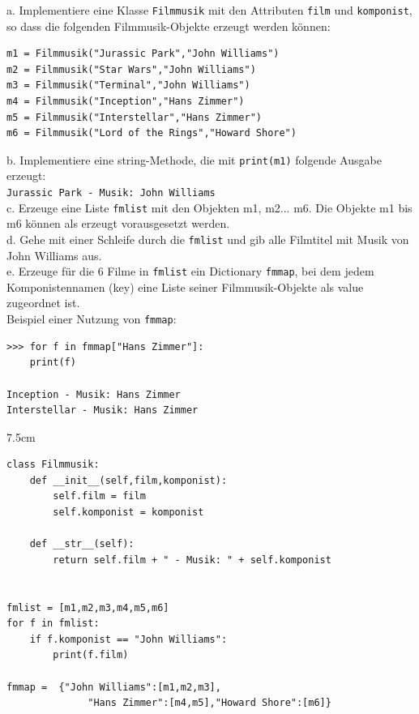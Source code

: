 \question[9]
a. Implementiere eine Klasse \texttt{Filmmusik} mit den Attributen
\texttt{film} und \texttt{komponist}, so dass
die folgenden Filmmusik-Objekte erzeugt werden können:
\begin{lstlisting}
m1 = Filmmusik("Jurassic Park","John Williams")
m2 = Filmmusik("Star Wars","John Williams")
m3 = Filmmusik("Terminal","John Williams")
m4 = Filmmusik("Inception","Hans Zimmer")
m5 = Filmmusik("Interstellar","Hans Zimmer")
m6 = Filmmusik("Lord of the Rings","Howard Shore")
\end{lstlisting}
b. Implementiere eine string-Methode, die mit \texttt{print(m1)}
folgende Ausgabe erzeugt: \\
\texttt{Jurassic Park - Musik: John Williams} \\
c. Erzeuge eine Liste \texttt{fmlist} mit den Objekten m1, m2... m6.
Die Objekte m1 bis m6 können als erzeugt vorausgesetzt werden. \\
d. Gehe mit einer Schleife durch die \texttt{fmlist} und gib
alle Filmtitel mit Musik von John Williams aus. \\
e. Erzeuge für die 6 Filme in \texttt{fmlist} ein Dictionary
\texttt{fmmap}, bei dem jedem Komponistennamen (key) eine Liste seiner
Filmmusik-Objekte als value zugeordnet ist. \\

Beispiel einer Nutzung von \texttt{fmmap}:
\begin{lstlisting}
>>> for f in fmmap["Hans Zimmer"]:
  	print(f)

Inception - Musik: Hans Zimmer
Interstellar - Musik: Hans Zimmer
\end{lstlisting}

\begin{solutionbox}{7.5cm}
\begin{lstlisting}
class Filmmusik:
    def __init__(self,film,komponist):
        self.film = film
        self.komponist = komponist

    def __str__(self):
        return self.film + " - Musik: " + self.komponist


fmlist = [m1,m2,m3,m4,m5,m6]
for f in fmlist:
    if f.komponist == "John Williams":
        print(f.film)

fmmap =  {"John Williams":[m1,m2,m3],
              "Hans Zimmer":[m4,m5],"Howard Shore":[m6]}
\end{lstlisting}
\end{solutionbox}
